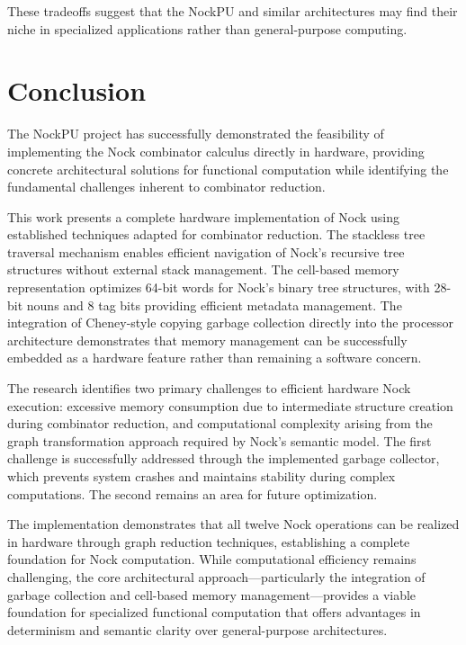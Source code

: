 \documentclass[twoside]{article}
\begin{document}
\noindent
These tradeoffs suggest that the NockPU and similar architectures may find their niche in specialized applications rather than general-purpose computing.

\section{Conclusion}

The NockPU project has successfully demonstrated the feasibility of implementing the Nock combinator calculus directly in hardware, providing concrete architectural solutions for functional computation while identifying the fundamental challenges inherent to combinator reduction.

This work presents a complete hardware implementation of Nock using established techniques adapted for combinator reduction. The stackless tree traversal mechanism enables efficient navigation of Nock's recursive tree structures without external stack management. The cell-based memory representation optimizes 64-bit words for Nock's binary tree structures, with 28-bit nouns and 8 tag bits providing efficient metadata management. The integration of Cheney-style copying garbage collection directly into the processor architecture demonstrates that memory management can be successfully embedded as a hardware feature rather than remaining a software concern.

The research identifies two primary challenges to efficient hardware Nock execution: excessive memory consumption due to intermediate structure creation during combinator reduction, and computational complexity arising from the graph transformation approach required by Nock's semantic model. The first challenge is successfully addressed through the implemented garbage collector, which prevents system crashes and maintains stability during complex computations. The second remains an area for future optimization.

The implementation demonstrates that all twelve Nock operations can be realized in hardware through graph reduction techniques, establishing a complete foundation for Nock computation. While computational efficiency remains challenging, the core architectural approach—particularly the integration of garbage collection and cell-based memory management—provides a viable foundation for specialized functional computation that offers advantages in determinism and semantic clarity over general-purpose architectures.

\printbibliography
\end{document}
